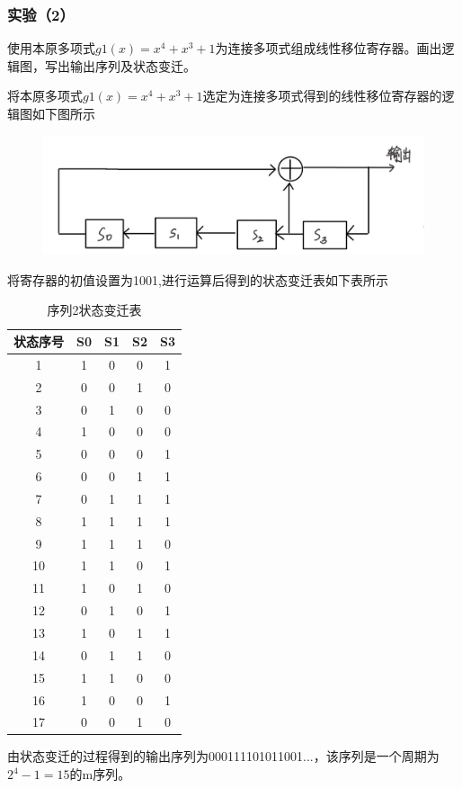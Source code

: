 \documentclass[a4paper,11pt,UTF8]{ctexart}
\newcommand{\bottomcaption}{%
\setlength{\abovecaptionskip}{6pt}%
\setlength{\belowcaptionskip}{6pt}%
\caption}
\newcommand{\xiaowuhao}{\fontsize{9pt}{\baselineskip}\selectfont}   %
\begin{document}
    \subsubsection{实验（2）}
      使用本原多项式$g1(x)=x^{4} +x^{3} +1$为连接多项式组成线性移位寄存器。画出逻辑图，写出输出序列及状态变迁。\par
\newpage
      将本原多项式$g1(x)=x^{4} +x^{3} +1$选定为连接多项式得到的线性移位寄存器的逻辑图如下图所示
      \begin{figure}[H]
        \centering
        \includegraphics[width=13cm]{线性移位寄存器2.jpg}
        \bottomcaption{\xiaowuhao{线性移位寄存器2}}
      \end{figure}
      将寄存器的初值设置为1001,进行运算后得到的状态变迁表如下表所示\par
      \begin{table}[h!]
        \begin{center}
          \caption{序列2状态变迁表}
          \begin{tabular}{c|c|c|c|c} %
            \textbf{状态序号} & \textbf{S0} & \textbf{S1} & \textbf{S2} & \textbf{S3} \\
            \hline
            1  & 1 & 0 & 0 & 1 \\
            2  & 0 & 0 & 1 & 0 \\
            3  & 0 & 1 & 0 & 0\\
            4  & 1 & 0 & 0 & 0\\
            5  & 0 & 0 & 0 & 1\\
            6  & 0 & 0 & 1 & 1\\
            7  & 0 & 1 & 1 & 1\\
            8  & 1 & 1 & 1 & 1\\
            9  & 1 & 1 & 1 & 0\\
            10 & 1 & 1 & 0 & 1\\
            11 & 1 & 0 & 1 & 0\\
            12 & 0 & 1 & 0 & 1\\
            13 & 1 & 0 & 1 & 1\\
            14 & 0 & 1 & 1 & 0\\
            15 & 1 & 1 & 0 & 0\\
            16 & 1 & 0 & 0 & 1\\
            17 & 0 & 0 & 1 & 0\\
          \end{tabular}
        \end{center}
      \end{table}
      由状态变迁的过程得到的输出序列为000111101011001...，该序列是一个周期为$2^{4}-1=15$的m序列。
\end{document}
